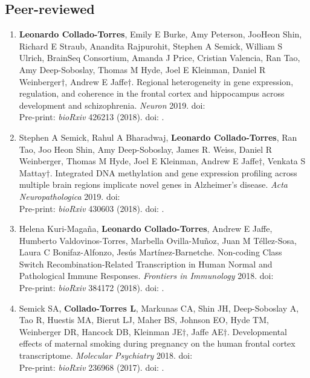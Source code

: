 \subsection{Peer-reviewed}
    \begin{enumerate}
        \item \textbf{Leonardo Collado-Torres}, Emily E Burke, Amy Peterson, JooHeon Shin, Richard E Straub, Anandita Rajpurohit, Stephen A Semick, William S Ulrich, BrainSeq Consortium, Amanda J Price, Cristian Valencia, Ran Tao, Amy Deep-Soboslay, Thomas M Hyde, Joel E Kleinman, Daniel R Weinberger$\dagger$, Andrew E Jaffe$\dagger$. Regional heterogeneity in gene expression, regulation, and coherence in the frontal cortex and hippocampus across development and schizophrenia. \emph{Neuron} 2019. doi: 
        \\ Pre-print: \emph{bioRxiv} 426213 (2018). doi: .
        
        \item Stephen A Semick, Rahul A Bharadwaj, \textbf{Leonardo Collado-Torres}, Ran Tao, Joo Heon Shin, Amy Deep-Soboslay, James R. Weiss, Daniel R Weinberger, Thomas M Hyde, Joel E Kleinman, Andrew E Jaffe$\dagger$, Venkata S Mattay$\dagger$. Integrated DNA methylation and gene expression profiling across multiple brain regions implicate novel genes in Alzheimer’s disease. \emph{Acta Neuropathologica} 2019. doi: 
        \\ Pre-print: \emph{bioRxiv} 430603 (2018). doi: .
            
        \item Helena Kuri-Magaña, \textbf{Leonardo Collado-Torres}, Andrew E Jaffe, Humberto Valdovinos-Torres, Marbella Ovilla-Muñoz, Juan M Téllez-Sosa, Laura C Bonifaz-Alfonzo, Jesús Martínez-Barnetche. Non-coding Class Switch Recombination-Related Transcription in Human Normal and Pathological Immune Responses. \emph{Frontiers in Immunology} 2018. doi: 
        \\ Pre-print: \emph{bioRxiv} 384172 (2018). doi: .
        
        \item Semick SA, \textbf{Collado-Torres L}, Markunas CA, Shin JH, Deep-Soboslay A, Tao R, Huestis MA, Bierut LJ, Maher BS, Johnson EO, Hyde TM, Weinberger DR, Hancock DB, Kleinman JE$\dagger$, Jaffe AE$\dagger$. Developmental effects of maternal smoking during pregnancy on the human frontal cortex transcriptome. \emph{Molecular Psychiatry} 2018. doi: 
        \\ Pre-print: \emph{bioRxiv} 236968 (2017). doi: .
        

\end{enumerate}

